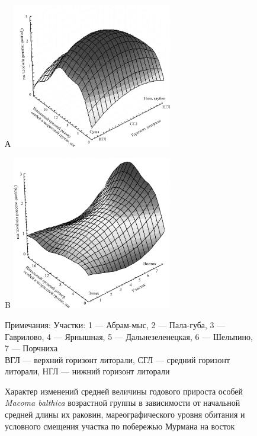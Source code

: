 	\begin{figure}[hbp]
		\begin{minipage}[b]{.5\linewidth}
			\begin{center}
				{\small А}
				\includegraphics[width=70mm]{../Barenc_Sea/growth_from_MSc/prirost_otklik_mareography.jpg}
			\end{center}
		\end{minipage}
	\hfil %
		\begin{minipage}[b]{.5\linewidth}
			\begin{center}
				{\small B}
				\includegraphics[width=70mm]{../Barenc_Sea/growth_from_MSc/prirost_otklik_geography.jpg}
			\end{center}
		\end{minipage}
	\caption{Характер изменений средней величины годового прироста особей {\it Macoma balthica} возрастной группы в зависимости от начальной средней длины их раковин, мареографического уровня обитания и условного смещения участка по побережью Мурмана на восток}
\footnotesize{Примечания: Участки: 1 --- Абрам-мыс, 2 --- Пала-губа, 3 --- Гаврилово, 4 --- Ярнышная, 5 --- Дальнезеленецкая, 6 --- Шельпино, 7 --- Порчниха\\
ВГЛ --- верхний горизонт литорали, СГЛ --- средний горизонт литорали, НГЛ --- нижний горизонт литорали}
	\label{ris:prirost:otklik}
	\end{figure}
